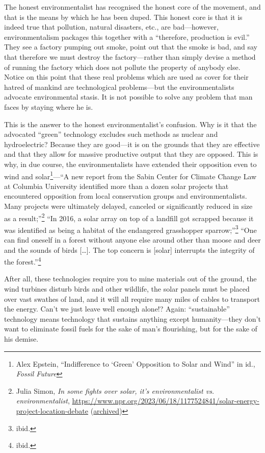 \documentclass[11pt]{article}
\begin{document}
The honest environmentalist has recognised the honest core of the movement, and that is the means by which he has been duped. This honest core is that it is indeed true that pollution, natural disasters, etc., are bad---however, environmentalism packages this together with a ``therefore, production is evil.'' They see a factory pumping out smoke, point out that the smoke is bad, and say that therefore we must destroy the factory---rather than simply devise a method of running the factory which does not pollute the property of anybody else. Notice on this point that these real problems which are used as cover for their hatred of mankind are technological problems---but the environmentalists advocate environmental stasis. It is not possible to solve any problem that man faces by staying where he is.

This is the answer to the honest environmentalist's confusion. Why is it that the advocated ``green'' technology excludes such methods as nuclear and hydroelectric? Because they are good---it is on the grounds that they are effective and that they allow for massive productive output that they are opposed. This is why, in due course, the environmentalists have extended their opposition even to wind and solar\footnote{Alex Epstein, ``Indifference to `Green' Opposition to Solar and Wind'' in id., \emph{Fossil Future}}---``A new report from the Sabin Center for Climate Change Law at Columbia University identified more than a dozen solar projects that encountered opposition from local conservation groups and environmentalists. Many projects were ultimately delayed, canceled or significantly reduced in size as a result;''\footnote{Julia Simon, \emph{In some fights over solar, it's environmentalist vs. environmentalist}, \url{https://www.npr.org/2023/06/18/1177524841/solar-energy-project-location-debate} (\href{https://archive.ph/09iJ0}{archived})} ``In 2016, a solar array on top of a landfill got scrapped because it was identified as being a habitat of the endangered grasshopper sparrow;''\footnote{ibid.} ``One can find oneself in a forest without anyone else around other than moose and deer and the sounds of birds [\ldots{}]. The top concern is [solar] interrupts the integrity of the forest.''\footnote{ibid.}

After all, these technologies require you to mine materials out of the ground, the wind turbines disturb birds and other wildlife, the solar panels must be placed over vast swathes of land, and it will all require many miles of cables to transport the energy. Can't we just leave well enough alone!? Again: ``sustainable'' technology means technology that sustains anything except humanity---they don't want to eliminate fossil fuels for the sake of man's flourishing, but for the sake of his demise.
\end{document}
